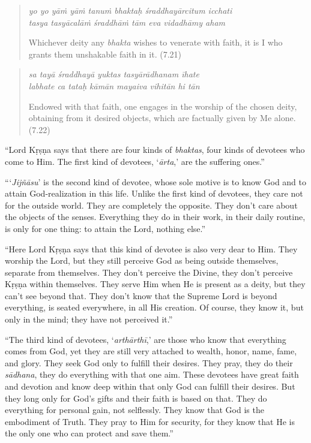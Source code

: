 \documentclass[12pt, twoside, openright]{memoir}
\begin{document}
\par
\begin{verse}
\textit{yo yo yāṁ yāṁ tanuṁ bhaktaḥ śraddhayārcitum icchati} \\
\textit{tasya tasyācalāṁ śraddhāṁ tām eva vidadhāmy aham}

\noindent Whichever deity any \textit{bhakta} wishes to venerate with faith, it is I who grants them unshakable faith in it. (7.21)
\end{verse}
\par



\par
\begin{verse}
\textit{sa tayā śraddhayā yuktas tasyārādhanam īhate} \\
\textit{labhate ca tataḥ kāmān mayaiva vihitān hi tān}

\noindent Endowed with that faith, one engages in the worship of the chosen deity, obtaining from it desired objects, which are factually given by Me alone. (7.22)
\end{verse}
\par



\enquote{Lord Kṛṣṇa says that there are four kinds of \textit{bhaktas}, four kinds of devotees who come to Him. The first kind of devotees, \enquote{\textit{ārta},} are the suffering ones.}

\enquote{\enquote{\textit{Jijñāsu}} is the second kind of devotee, whose sole motive is to know God and to attain God-realization in this life. Unlike the first kind of devotees, they care not for the outside world. They are completely the opposite. They don’t care about the objects of the senses. Everything they do in their work, in their daily routine, is only for one thing: to attain the Lord, nothing else.}

\enquote{Here Lord Kṛṣṇa says that this kind of devotee is also very dear to Him. They worship the Lord, but they still perceive God as being outside themselves, separate from themselves. They don’t perceive the Divine, they don’t perceive Kṛṣṇa within themselves. They serve Him when He is present as a deity, but they can’t see beyond that. They don’t know that the Supreme Lord is beyond everything, is seated everywhere, in all His creation. Of course, they know it, but only in the mind; they have not perceived it.}

\enquote{The third kind of devotees, \enquote{\textit{arthārthī},} are those who know that everything comes from God, yet they are still very attached to wealth, honor, name, fame, and glory. They seek God only to fulfill their desires. They pray, they do their \textit{sādhana}, they do everything with that one aim. These devotees have great faith and devotion and know deep within that only God can fulfill their desires. But they long only for God’s gifts and their faith is based on that. They do everything for personal gain, not selflessly. They know that God is the embodiment of Truth. They pray to Him for security, for they know that He is the only one who can protect and save them.}
\end{document}
